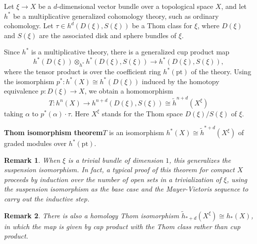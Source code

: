 \documentclass[12pt]{article}
\newcommand{\tensor}{\otimes}
\newtheorem{rmk}{Remark}
\newcommand{\isom}{\cong}
\newcommand{\pt}{\mathrm{pt}}
\begin{document}
Let $\xi\to X$ be a $d$-dimensional vector bundle over a topological space $X$, and let $h^*$ be a multiplicative generalized cohomology theory, such as ordinary cohomology. Let $\tau\in h^d(D(\xi),S(\xi))$ be a Thom class for $\xi$, where $D(\xi)$ and $S(\xi)$ are the associated disk and sphere bundles of $\xi$. 

\newcommand{\rh}{\tilde{h}}

Since $h^*$ is a multiplicative theory, there is a generalized cup product map $$h^*(D(\xi))\tensor_{h^*}h^*(D(\xi),S(\xi))\to h^*(D(\xi),S(\xi)),$$ where the tensor product is over the coefficient ring $h^*(\pt)$ of the theory. Using the isomorphism $p^*:h^*(X)\isom h^*(D(\xi))$ induced by the homotopy equivalence $p:D(\xi)\to X$, we obtain a homomorphism 
$$T: h^n(X)\to h^{n+d}(D(\xi),S(\xi))\isom \rh^{n+d}(X^\xi) $$
taking $\alpha$ to $p^*(\alpha)\cdot\tau$. Here $X^\xi$ stands for the Thom space $D(\xi)/S(\xi)$ of $\xi$.

\medskip
\textbf{Thom isomorphism theorem}\quad $T$ is an isomorphism $h^*(X)\isom \rh^{*+d}(X^\xi)$ of graded modules over $h^*(\pt)$.
\medskip

\begin{rmk} When $\xi$ is a trivial bundle of dimension $1$, this generalizes the suspension isomorphism. In fact, a typical proof of this theorem for compact $X$ proceeds by induction over the number of open sets in a trivialization of $\xi$, using the suspension isomorphism as the base case and  the Mayer-Vietoris sequence to carry out the inductive step.
\end{rmk}

\begin{rmk}
There is also a homology Thom isomorphism $\rh_{*+d}(X^\xi)\isom h_*(X)$, in which the map is given by cap product with the Thom class rather than cup product.
\end{rmk}
\end{document}
